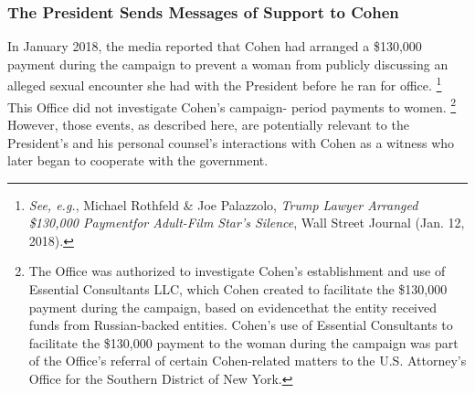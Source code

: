 {\subsubsection{The President Sends Messages of Support to Cohen}

In January 2018, the media reported that Cohen had arranged a \$130,000 payment during the campaign to prevent a woman from publicly discussing an alleged sexual encounter she had with the President before he ran for office.%
\footnote{\textit{See, e.g.}, Michael Rothfeld \& Joe Palazzolo, \textit{Trump Lawyer Arranged \$130,000 Paymentfor Adult-Film Star’s Silence}, Wall Street Journal (Jan. 12, 2018).}
This Office did not investigate Cohen's campaign- period payments to women.%
\footnote{The Office was authorized to investigate Cohen’s establishment and use of Essential Consultants LLC, which Cohen created to facilitate the \$130,000 payment during the campaign, based on evidencethat the entity received funds from Russian-backed entities.
Cohen’s use of Essential Consultants to facilitate the \$130,000 payment to the woman during the campaign was part of the Office’s referral of certain Cohen-related matters to the U.S. Attorney’s Office for the Southern District of New York.}
However, those events, as described here, are potentially relevant to the President's and his personal counsel's interactions with Cohen as a witness who later began to cooperate with the government.

}
